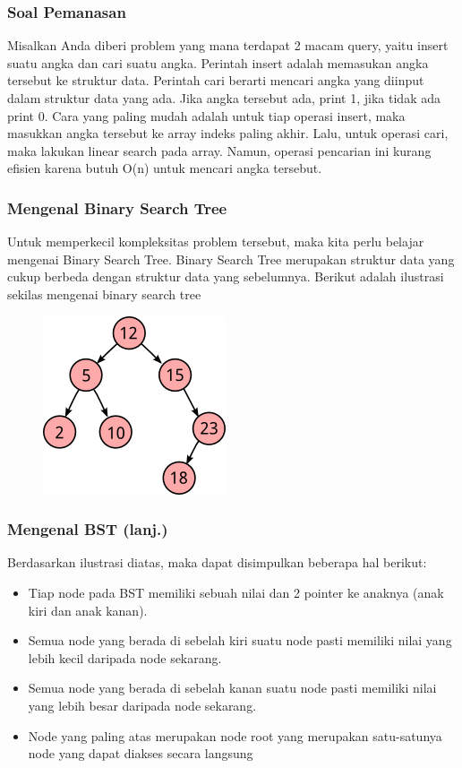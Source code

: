 \begin{frame}
\frametitle{Soal Pemanasan}
Misalkan Anda diberi problem yang mana terdapat 2 macam query, yaitu insert suatu angka dan cari suatu angka. Perintah insert adalah memasukan angka tersebut ke struktur data. Perintah cari berarti mencari angka yang diinput dalam struktur data yang ada. Jika angka tersebut ada, print 1, jika tidak ada print 0.
\newline\newline
Cara yang paling mudah adalah untuk tiap operasi insert, maka masukkan angka tersebut ke array indeks paling akhir. Lalu, untuk operasi cari, maka lakukan linear search pada array. Namun, operasi pencarian ini kurang efisien karena butuh O(n) untuk mencari angka tersebut.
\end{frame}

\begin{frame}
\frametitle{Mengenal Binary Search Tree}
Untuk memperkecil kompleksitas problem tersebut, maka kita perlu belajar mengenai Binary Search Tree. Binary Search Tree merupakan struktur data yang cukup berbeda dengan struktur data yang sebelumnya. Berikut adalah ilustrasi sekilas mengenai binary search tree

\begin{figure}
  \centering
  \includegraphics[width=4 cm]{asset/bst.png}
\end{figure}
\end{frame}

\begin{frame}
\frametitle{Mengenal BST (lanj.)}
Berdasarkan ilustrasi diatas, maka dapat disimpulkan beberapa hal berikut:
\begin{itemize}
  \item Tiap node pada BST memiliki sebuah nilai dan 2 pointer ke anaknya (anak kiri dan anak kanan).
  \item Semua node yang berada di sebelah kiri suatu node pasti memiliki nilai yang lebih kecil daripada node sekarang.
  \item Semua node yang berada di sebelah kanan suatu node pasti memiliki nilai yang lebih besar daripada node sekarang.
  \item Node yang paling atas merupakan node \alert{root} yang merupakan satu-satunya node yang dapat diakses secara langsung
\end{itemize}
\end{frame}

